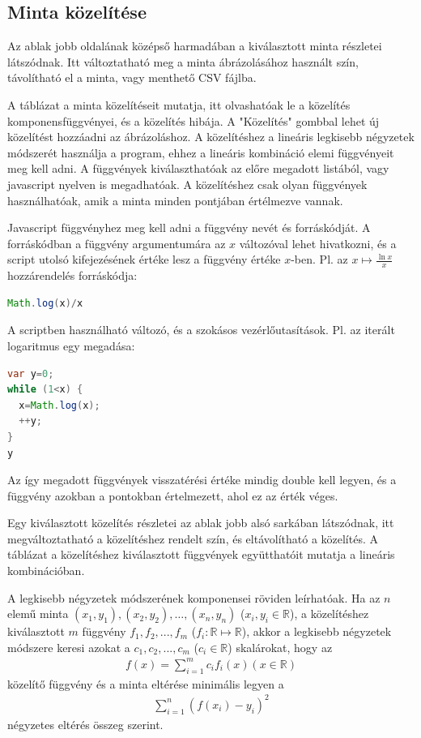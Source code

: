 \subsection{Minta közelítése}

Az ablak jobb oldalának középső harmadában a kiválasztott minta részletei látszódnak.
Itt változtatható meg a minta ábrázolásához használt szín, távolítható el a minta,
vagy menthető CSV fájlba.

A táblázat a minta közelítéseit mutatja,
itt olvashatóak le a közelítés komponensfüggvényei, és a közelítés hibája.
A "Közelítés" gombbal lehet új közelítést hozzáadni az ábrázoláshoz.
A közelítéshez a lineáris legkisebb négyzetek módszerét használja a program,
ehhez a lineáris kombináció elemi függvényeit meg kell adni.
A függvények kiválaszthatóak az előre megadott listából,
vagy javascript nyelven is megadhatóak.
A közelítéshez csak olyan függvények használhatóak, amik a minta
minden pontjában értélmezve vannak.

Javascript függvényhez meg kell adni a függvény nevét és forráskódját.
A forráskódban a függvény argumentumára az $x$ változóval lehet hivatkozni,
és a script utolsó kifejezésének értéke lesz a függvény
értéke $x$-ben. Pl. az $x \mapsto \frac{\ln{x}}{x}$ hozzárendelés
forráskódja:

\begin{lstlisting}[basicstyle=\small, language=Java]
Math.log(x)/x
\end{lstlisting}

A scriptben használható változó, és a szokásos vezérlőutasítások.
Pl. az iterált logaritmus egy megadása:
\begin{lstlisting}[basicstyle=\small, language=Java,morekeywords=var]
var y=0;
while (1<x) {
  x=Math.log(x);
  ++y;
}
y
\end{lstlisting}

Az így megadott függvények visszatérési értéke mindig double kell legyen,
és a függvény azokban a pontokban értelmezett, ahol ez az érték véges.

Egy kiválasztott közelítés részletei az ablak jobb alsó sarkában látszódnak,
itt megváltoztatható a közelítéshez rendelt szín, és eltávolítható a közelítés.
A táblázat a közelítéshez kiválasztott függvények együtthatóit mutatja
a lineáris kombinációban.

A legkisebb négyzetek módszerének komponensei
röviden leírhatóak.
Ha az $n$ elemű minta
$(x_1, y_1), (x_2, y_2), \ldots, (x_n, y_n)$
($x_i, y_i \in \mathbb{R}$),
a közelítéshez kiválasztott $m$ függvény
$f_1, f_2, ..., f_m$ ($f_i:\mathbb{R} \mapsto \mathbb{R}$),
akkor a legkisebb négyzetek módszere
keresi azokat a $c_1, c_2, ..., c_m$ ($c_i \in \mathbb{R}$)
skalárokat, hogy az
\begin{align*}
f(x)=\sum_{i=1}^m c_i f_i(x) (x \in \mathbb{R})
\end{align*}
közelítő függvény és a minta eltérése minimális
legyen a
\begin{align*}
\sum_{i=1}^{n} (f(x_i)-y_i)^2
\end{align*}
négyzetes eltérés összeg szerint.


